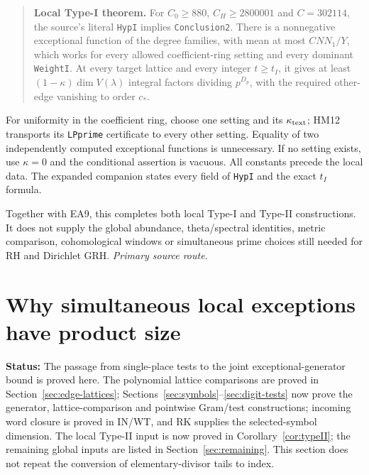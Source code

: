\documentclass[11pt,a4paper]{article}
\numberwithin{equation}{section}
\theoremstyle{remark}\newtheorem{remark}[theorem]{Remark}
\newcommand{\status}[1]{\textbf{Status:} #1}
\begin{document}
\begin{quote}
\textbf{Local Type-I theorem.}
For $C_0\ge880$, $C_H\ge2800001$ and $C=302114$,
the source's literal \texttt{HypI} implies
\texttt{Conclusion2}.
There is a nonnegative exceptional function of the degree
families, with mean at most $CNN_1/Y$, which works for every
allowed coefficient-ring setting and every dominant
\texttt{WeightI}. At every target lattice and every integer
$t\ge t_I$, it gives at least
$(1-\kappa)\dim V(\lambda)$ integral factors dividing $p^{D_p}$,
with the required other-edge vanishing to order $c_*$.
\end{quote}

For uniformity in the coefficient ring, choose one setting and
its $\kappa_{\rm text}$; HM12 transports its \texttt{LPprime}
certificate to every other setting. Equality of two independently
computed exceptional functions is unnecessary. If no setting
exists, use $\kappa=0$ and the conditional assertion is vacuous.
All constants precede the local data. The expanded companion
states every field of \texttt{HypI} and the exact $t_I$ formula.

Together with EA9, this completes both local Type-I and Type-II
constructions. It does not supply the global abundance,
theta/spectral identities, metric comparison, cohomological
windows or simultaneous prime choices still needed for RH
and Dirichlet GRH.
\noindent\textit{Primary source route.}\cite{type-one-complete}


\section{Why simultaneous local exceptions have product size}\label{sec:joint-rank}

\status{The passage from single-place tests to the joint exceptional-generator bound is proved here. The polynomial lattice comparisons are proved in Section~\ref{sec:edge-lattices}; Sections~\ref{sec:symbols}--\ref{sec:digit-tests} now prove the generator, lattice-comparison and pointwise Gram/test constructions; incoming word closure is proved in IN/WT, and RK supplies the selected-symbol dimension. The local Type-II input is now proved in Corollary~\ref{cor:typeII}; the remaining global inputs are listed in Section~\ref{sec:remaining}. This section does not repeat the conversion of elementary-divisor tails to index.}
\end{document}
